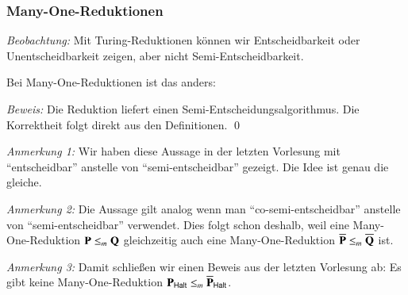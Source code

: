 \documentclass[aspectratio=1610,onlymath]{beamer}
\begin{document}
\begin{frame}\frametitle{Many-One-Reduktionen}

\emph{Beobachtung:} Mit Turing-Reduktionen können wir Entscheidbarkeit oder Unentscheidbarkeit zeigen, aber nicht Semi-Entscheidbarkeit.\medskip

Bei Many-One-Reduktionen ist das anders:


\pause\emph{Beweis:} Die Reduktion liefert einen Semi-Entscheidungs\-algorithmus.
Die Korrektheit folgt direkt aus den Definitionen.
\qed\bigskip

\emph{Anmerkung 1:} Wir haben diese Aussage in der letzten Vorlesung mit "`entscheidbar"' anstelle
von "`semi-entscheidbar"' gezeigt. Die Idee ist genau die gleiche.

\emph{Anmerkung 2:} Die Aussage gilt analog wenn man "`co-semi-entscheidbar"' anstelle
von "`semi-entscheidbar"' verwendet. Dies folgt schon deshalb, weil eine Many-One-Reduktion
$\textbf{\textcolor{black}{P}}\leq_m \textbf{\textcolor{black}{Q}}$ gleichzeitig auch eine Many-One-Reduktion $\overline{\textbf{\textcolor{black}{P}}}\leq_m \overline{\textbf{\textcolor{black}{Q}}}$ ist.


\emph{Anmerkung 3:} Damit schließen wir einen Beweis aus der letzten Vorlesung ab: Es gibt keine Many-One-Reduktion $\textbf{\textcolor{black}{P}}_{\textsf{Halt}}\leq_m \overline{\textbf{\textcolor{black}{P}}}_{\textsf{Halt}}$.

\end{frame}

% 
% 


\end{document}
